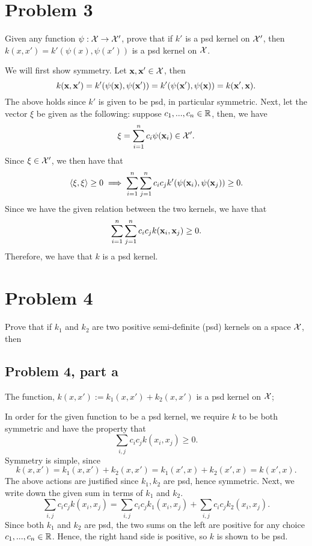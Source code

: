 \section{Problem 3}
Given any function $\psi: \mathcal{X} \to \mathcal{X}'$, prove that if $k'$ is a psd kernel on $\mathcal{X}'$, then $k(x, x') = k'(\psi(x), \psi(x'))$ is a psd kernel on $\mathcal{X}$.
\partbreak
\begin{solution}

    We will first show symmetry. Let $\textbf{x}, \textbf{x}' \in \mathcal{X}$, then
    \[k(\textbf{x}, \textbf{x}') = k'(\psi(\textbf{x}), \psi(\textbf{x}')) = k'(\psi(\textbf{x}'), \psi(\textbf{x})) = k(\textbf{x}', \textbf{x}).\]
    The above holds since $k'$ is given to be psd, in particular symmetric. Next, let the vector $\xi$ be given as the following: suppose $c_1, ..., c_n \in \mathbb{R}$, then, we have
    \[\xi = \sum_{i  =1}^n c_i \psi(\textbf{x}_i) \in \mathcal{X}'.\]
    Since $\xi \in \mathcal{X}'$, we then have that 
    \[\langle \xi, \xi \rangle \geq 0 \implies \sum_{i = 1}^n\sum_{j  =1}^n c_ic_jk'(\psi(\textbf{x}_i), \psi(\textbf{x}_j)) \geq 0.\]
    Since we have the given relation between the two kernels, we have that
    \[\sum_{i = 1}^n\sum_{j  =1}^n c_ic_jk(\textbf{x}_i, \textbf{x}_j) \geq 0.\]
    Therefore, we have that $k$ is a psd kernel. 
\end{solution}
\newpage
\section{Problem 4}
Prove that if $k_1$ and $k_2$ are two positive semi-definite (psd) kernels on a space $\mathcal{X}$, then 
\subsection{Problem 4, part a}
The function, $k(x, x') := k_1(x, x') + k_2(x, x')$ is a psd kernel on $\mathcal{X}$;
\partbreak
\begin{solution}

    In order for the given function to be a psd kernel, we require $k$ to be both symmetric and have the property that 
    \[\sum_{i, j}c_ic_jk(x_i, x_j) \geq 0.\]
    Symmetry is simple, since 
    \[k(x, x') = k_1(x, x') + k_2(x, x') = k_1(x', x) + k_2(x', x) = k(x', x).\]
    The above actions are justified since $k_1, k_2$ are psd, hence symmetric. Next, we write down the given sum in terms of $k_1$ and $k_2$.
    \[\sum_{i, j} c_ic_jk(x_i, x_j) = \sum_{i, j}c_ic_jk_1(x_i, x_j) + \sum_{i, j}c_ic_jk_2(x_i, x_j).\]
    Since both $k_1$ and $k_2$ are psd, the two sums on the left are positive for any choice $c_1, ..., c_n \in \mathbb{R}$. Hence, the right hand side is positive, so $k$ is shown to be psd. 
\end{solution}

